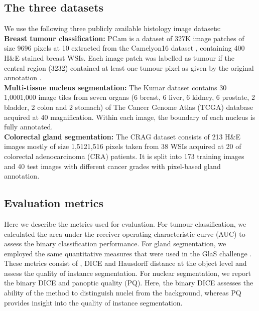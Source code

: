 \documentclass[journal]{IEEEtran}
\begin{document}
	\subsection{The three datasets} \label{section:datasets}
 	We use the following three publicly available histology image datasets:\\
 	\textbf{Breast tumour classification:} PCam \cite{veeling2018rotation} is a dataset of 327K image patches of size 9696 pixels at 10 extracted from the Camelyon16 dataset \cite{bejnordi2017diagnostic}, containing 400 H\&E stained breast WSIs. Each image patch was labelled as tumour if the central region (3232) contained at least one tumour pixel as given by the original annotation \cite{bejnordi2017diagnostic}.\\
	\textbf{Multi-tissue nucleus segmentation:} The Kumar \cite{kumar2017dataset} dataset contains 30 1,0001,000 image tiles from seven organs (6 breast, 6 liver, 6 kidney, 6 prostate, 2 bladder, 2 colon and 2 stomach) of The Cancer Genome Atlas (TCGA) database acquired at 40 magnification. Within each image, the boundary of each nucleus is fully annotated. \\
	\textbf{Colorectal gland segmentation:} The CRAG dataset \cite{graham2019mild} consists of 213 H\&E images mostly of size 1,5121,516 pixels taken from 38 WSIs acquired at 20 of colorectal adenocarcinoma (CRA) patients. It is split into 173 training images and 40 test images with different cancer grades with pixel-based gland annotation.
    
    \subsection{Evaluation metrics} \label{dup1 section:metrics}
    
    Here we describe the metrics used for evaluation. For tumour classification, we calculated the area under the receiver operating characteristic curve (AUC) to assess the binary classification performance. For gland segmentation, we employed the same quantitative measures that were used in the GlaS challenge \cite{sirinukunwattana2017gland}. These metrics consist of , DICE and Hausdorff distance at the object level and assess the quality of instance segmentation. For nuclear segmentation, we report the binary DICE and panoptic quality (PQ). Here, the binary DICE assesses the ability of the method to distinguish nuclei from the background, whereas PQ provides insight into the quality of instance segmentation. 
    
\end{document}
